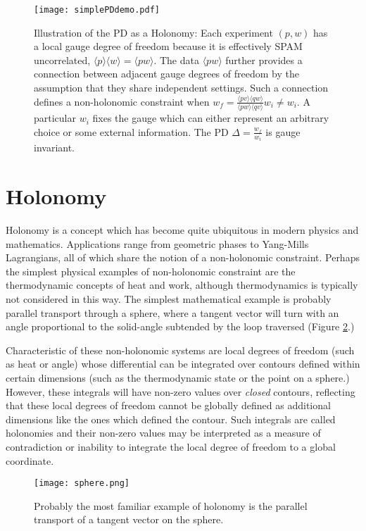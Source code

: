 \documentclass[pra, 10pt, notitlepage, twocolumn]{revtex4-1}
\begin{document}
\begin{figure}[h!]
\centering
\texttt{[image: simplePDdemo.pdf]}
\caption{Illustration of the PD as a Holonomy:
Each experiment $(p,w)$ has a local gauge degree of freedom because it is effectively SPAM uncorrelated, $\langle p \rangle \langle w \rangle = \langle pw \rangle$.
The data $\langle pw \rangle$ further provides a connection between adjacent gauge degrees of freedom by the assumption that they share independent settings.
Such a connection defines a non-holonomic constraint when $w_f = \frac{\langle pv \rangle\langle qw \rangle}{\langle pw \rangle \langle qv \rangle}w_i \neq w_i$.
A particular $w_i$ fixes the gauge which can either represent an arbitrary choice or some external information.
The PD $\Delta=\frac{w_f}{w_i}$ is gauge invariant.}\label{demo}
\end{figure}




\section{Holonomy}\label{horono}

Holonomy is a concept which has become quite ubiquitous in modern physics and mathematics.
Applications range from geometric phases to Yang-Mills Lagrangians, all of which share the notion of a non-holonomic constraint.
Perhaps the simplest physical examples of non-holonomic constraint are the thermodynamic concepts of heat and work,
although thermodynamics is typically not considered in this way.
The simplest mathematical example is probably parallel transport through a sphere,
where a tangent vector will turn with an angle proportional to the solid-angle subtended by the loop traversed (Figure \ref{sphereho}.)

Characteristic of these non-holonomic systems are local degrees of freedom (such as heat or angle) whose differential can be integrated over contours defined within certain dimensions (such as the thermodynamic state or the point on a sphere.)
However, these integrals will have non-zero values over \emph{closed} contours,
reflecting that these local degrees of freedom cannot be globally defined as additional dimensions like the ones which defined the contour.
Such integrals are called holonomies and their non-zero values may be interpreted as a measure of contradiction
or inability to integrate the local degree of freedom to a global coordinate.


\begin{figure}[h!]
\centering
\texttt{[image: sphere.png]}
\caption{Probably the most familiar example of holonomy is the parallel transport of a tangent vector on the sphere.}\label{sphereho}
\end{figure}
\end{document}
